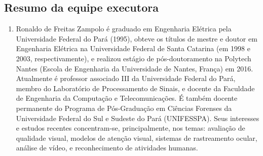 \subsection{Resumo da equipe executora}
\label{ssec:equipe}
\begin{enumerate}
	\item Ronaldo de Freitas Zampolo é graduado em Engenharia Elétrica pela Universidade Federal do Pará (1995), obteve os títulos de mestre e doutor em Engenharia Elétrica na Universidade Federal de Santa Catarina (em 1998 e 2003, respectivamente), e realizou estágio de pós-doutoramento na Polytech Nantes (Escola de Engenharia da Universidade de Nantes, França) em 2016. Atualmente é professor associado III da Universidade Federal do Pará, membro do Laboratório de Processamento de Sinais, e docente da Faculdade de Engenharia da Computação e Telecomunicações. É também docente permanente do Programa de Pós-Graduação em Ciências Forenses da Universidade Federal do Sul e Sudeste do Pará (UNIFESSPA). Seus interesses e estudos recentes concentram-se, principalmente, nos temas: avaliação de qualidade visual, modelos de atenção visual, sistemas de rastreamento ocular, análise de vídeo, e reconhecimento de atividades humanas. 


\end{enumerate}
